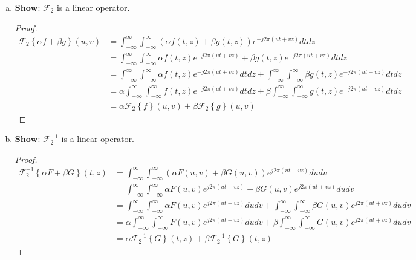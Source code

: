 \documentclass{paper}
\begin{document}
\begin{enumerate}[(a)] 

\item $\textbf{Show}$: $\mathcal{F}_2$ is a linear operator. 
\begin{proof}
\begin{align*}
    \mathcal{F}_2 \left \{\alpha f + \beta g \right\}(u,v) 
    &= \int_{-\infty}^{\infty} \int_{-\infty}^{\infty} ( \alpha f(t,z) + \beta g(t,z) ) e^{-j 2 \pi (ut+vz)} dt dz \\
    &= \int_{-\infty}^{\infty} \int_{-\infty}^{\infty} \alpha f(t,z) e^{-j 2 \pi (ut+vz)} + \beta g(t,z) e^{-j 2 \pi (ut+vz)} dt dz \\
    &= \int_{-\infty}^{\infty} \int_{-\infty}^{\infty} \alpha f(t,z) e^{-j 2 \pi (ut+vz)} dt dz + \int_{-\infty}^{\infty} \int_{-\infty}^{\infty} \beta g(t,z) e^{-j 2 \pi (ut+vz)} dt dz \\
    &= \alpha \int_{-\infty}^{\infty} \int_{-\infty}^{\infty}  f(t,z) e^{-j 2 \pi (ut+vz)} dt dz + \beta \int_{-\infty}^{\infty} \int_{-\infty}^{\infty} g(t,z) e^{-j 2 \pi (ut+vz)} dt dz \\
    &= \alpha \mathcal{F}_2 \left \{f\right\}(u,v) + \beta \mathcal{F}_2 \left \{g \right\}(u,v)  
\end{align*}
\end{proof}

\item $\textbf{Show}$: $\mathcal{F}^{-1}_2$ is a linear operator. 
\begin{proof}
\begin{align*}
    \mathcal{F}^{-1}_2 \left \{\alpha F + \beta G \right\}(t,z) 
    &= \int_{-\infty}^{\infty} \int_{-\infty}^{\infty} ( \alpha F(u,v) + \beta G(u,v) ) e^{j 2 \pi (ut+vz)} du dv \\
    &= \int_{-\infty}^{\infty} \int_{-\infty}^{\infty} \alpha F(u,v) e^{j 2 \pi (ut+vz)} + \beta G(u,v) e^{j 2 \pi (ut+vz)} du dv \\
    &= \int_{-\infty}^{\infty} \int_{-\infty}^{\infty} \alpha F(u,v) e^{j 2 \pi (ut+vz)} du dv + \int_{-\infty}^{\infty} \int_{-\infty}^{\infty} \beta G(u,v) e^{j 2 \pi (ut+vz)} du dv \\
    &= \alpha \int_{-\infty}^{\infty} \int_{-\infty}^{\infty} F(u,v) e^{j 2 \pi (ut+vz)} du dv + \beta \int_{-\infty}^{\infty} \int_{-\infty}^{\infty} G(u,v) e^{j 2 \pi (ut+vz)} du dv \\
    &= \alpha \mathcal{F}^{-1}_2 \left \{G\right\}(t,z) + \beta \mathcal{F}^{-1}_2 \left \{G \right\}(t,z)  
\end{align*}
\end{proof}
\end{enumerate} 
\end{document}
